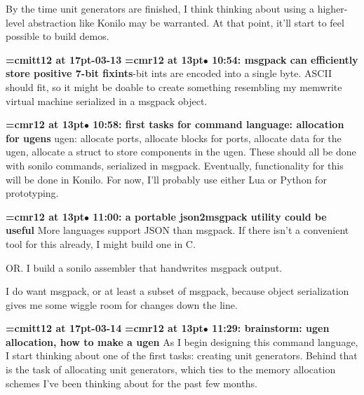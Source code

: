 By the time unit generators are finished, I think thinking about using a higher-level abstraction like Konilo may be warranted. At that point, it'll start to feel possible to build demos.
\par

{\medskip\noindent\bf\font\titlefont=cmitt12 at 17pt-03-13}\medskip
{\smallskip\noindent\bf\font\titlefont=cmr12 at 13pt\titlefont $\bullet$ 10:54: msgpack can efficiently store positive 7-bit fixints}-bit ints are encoded into a single byte. ASCII should fit, so it might be doable to create something resembling my memwrite virtual machine serialized in a msgpack object.
\par

{\smallskip\noindent\bf\font\titlefont=cmr12 at 13pt\titlefont $\bullet$ 10:58: first tasks for command language: allocation for ugens}\smallskip
ugen: allocate ports, allocate blocks for ports, allocate data for the ugen, allocate a struct to store components in the ugen. These should all be done with sonilo commands, serialized in msgpack. Eventually, functionality for this will be done in Konilo. For now, I'll probably use either Lua or Python for prototyping.
\par

{\smallskip\noindent\bf\font\titlefont=cmr12 at 13pt\titlefont $\bullet$ 11:00: a portable json2msgpack utility could be useful}\smallskip
More languages support JSON than msgpack. If there isn't a convenient tool for this already, I might build one in C.
\par

OR. I build a sonilo assembler that handwrites msgpack output.
\par

I do want msgpack, or at least a subset of msgpack, because object serialization gives me some wiggle room for changes down the line.
\par

{\medskip\noindent\bf\font\titlefont=cmitt12 at 17pt-03-14}\medskip
{\smallskip\noindent\bf\font\titlefont=cmr12 at 13pt\titlefont $\bullet$ 11:29: brainstorm: ugen allocation, how to make a ugen}\smallskip
As I begin designing this command language, I start thinking about one of the first tasks: creating unit generators. Behind that is the task of allocating unit generators, which ties to the memory allocation schemes I've been thinking about for the past few months.
\par

